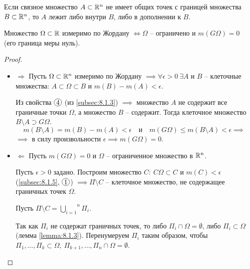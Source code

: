 \begin{lemma}\label{lemma:8.1.3}
    Если связное множество $ A \subset \mathbb{R}^n $ не имеет общих точек с границей множества $ B \subset \mathbb{R}^n $, то $ A $ лежит либо внутри $ B $, либо в дополнении к $ B $.
\end{lemma}

\begin{theorem}
    Множество $ \Omega \subset \mathbb{R} $ измеримо по Жордану $ \iff \Omega $ -- ограничено и $ m(G\Omega) = 0 $ (его граница меры нуль).
\end{theorem}

\begin{proof}\leavevmode
    \begin{itemize}
        \item $ \boxed{\Rightarrow} $ Пусть $ \Omega \subset \mathbb{R}^n $ измеримо по Жордану $ \implies \forall \epsilon > 0 \ \exists A $ и $ B $ -- клеточные множества: $ A \subset \Omega \subset B $ и $ m(B) - m(A) < \epsilon $.

              Из свойства $ \circled{4} $ (из \ref{subsec:8.1.3}) $ \implies $ множество $ A $ не содержит все граничные точки $ \Omega $, а множество $ B $ -- содержит. Тогда клеточное множество $ B \setminus A \supset G\Omega $.
              \[
                  m(B\setminus A) = m(B) - m(A) < \epsilon \quad \text{и} \quad m(G\Omega) \leqslant m(B\setminus A) < \epsilon \implies
              \]
              $ \implies $ в силу произвольности $ \epsilon \implies m(G\Omega) = 0 $.

        \item $ \boxed{\Leftarrow} $ Пусть $ m(G\Omega) = 0 $ и $ \Omega $ -- ограниченное множество в $ \mathbb{R}^n $.

              Пусть $ \epsilon > 0 $ задано. Построим множество $ C: \ C\Omega \subset C $ и $ m(C) < \epsilon $ (\ref{subsec:8.1.5}, $ \circled{1} $) $ \implies \Pi \setminus C $ -- клеточное множество, не содержащее граничных точек $ \Omega $.

              Пусть $ \Pi \setminus C = \overset{n}{\underset{i=1}{\bigcup}}\Pi_i $.

              Так как $ \Pi_i $ не содержат граничных точек, то либо $ \Pi_i \cap \Omega = \emptyset $, либо $ \Pi_i \subset \Omega $ (лемма \ref{lemma:8.1.3}). Перенумеруем $ \Pi_i $ таким образом, чтобы $ \Pi_1,\ldots,\Pi_k \subset \Omega, \ \Pi_{k+1},\ldots,\Pi_n \cap \Omega = \emptyset $.


\end{itemize}
\end{proof}
